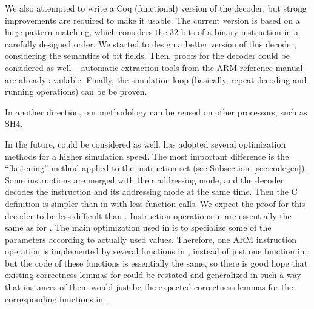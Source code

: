 We also attempted to write a Coq (functional) version of the decoder,
but strong improvements are required to make it usable.
The current version is based on a huge pattern-matching,
which considers the 32 bits of a binary instruction
in a carefully designed order.
We started to design a better version of this decoder,
considering the semantics of bit fields.
Then, proofs for the decoder could be considered as well
-- automatic extraction tools from the ARM reference manual
are already available.
Finally, the simulation loop
(basically, repeat decoding and running operations) can be be proven.

In another direction, our methodology can be reused on other processors,
such as SH4.

In the future,  could be considered as well.
 has adopted several optimization methods for a higher simulation
speed. The most important difference is the ``flattening'' method applied
to the instruction set (see Subsection~\ref{sec:codegen}).
Some instructions are merged with their addressing mode,
and the  decoder decodes the instruction and its addressing
mode at the same time. 
Then the C definition is simpler than in \simlight with less function calls.
We expect the proof for this  decoder
to be less difficult than \simlight.
%
Instruction operations in  are essentially the same as for \simlight.
The main optimization used in  
is to specialize some of the parameters according to actually used values.
Therefore, one ARM instruction operation is implemented by
several functions in , instead of just one function in \simlight;
but the code of these functions is essentially the same,
so there is good hope that 
existing correctness lemmas for \simlight could be
restated and generalized in such a way that
instances of them would just be the expected correctness lemmas 
for the corresponding functions in .


